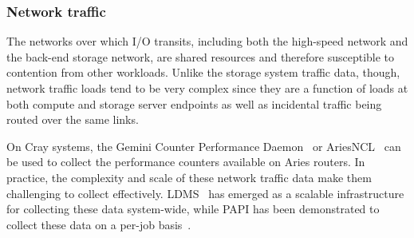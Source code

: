 \subsubsection{Network traffic} \label{sec:architecture/components/network}

The networks over which I/O transits, including both the high-speed network and the back-end storage network, are shared resources and therefore susceptible to contention from other workloads.
Unlike the storage system traffic data, though, network traffic loads tend to be very complex since they are a function of loads at both compute and storage server endpoints as well as incidental traffic being routed over the same links.

On Cray systems, the Gemini Counter Performance Daemon~\cite{Pedretti2013,Brandt2016} or AriesNCL~\cite{ariesncl} can be used to collect the performance counters available on Aries routers.
In practice, the complexity and scale of these network traffic data make them challenging to collect effectively.
LDMS~\cite{Agelastos2014ldms} has emerged as a scalable infrastructure for collecting these data system-wide, while PAPI has been demonstrated to collect these data on a per-job basis~\cite{Groves2017}.


